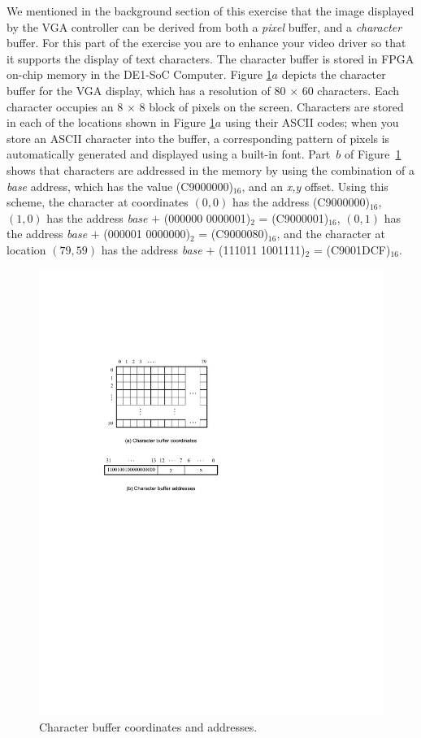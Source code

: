 \documentclass[epsfig,10pt,fullpage]{article}
\begin{document}
\noindent
We mentioned in the background section of this exercise that the image displayed by the VGA
controller can be derived from both a {\it pixel} buffer, and a {\it character} buffer. For 
this part of the exercise you are to enhance your video driver so that it supports the
display of text characters.  The character buffer is stored in FPGA on-chip memory in the 
DE1-SoC Computer. Figure \ref{fig:chars}$a$ depicts the character buffer for the VGA
display, which has a resolution of 80 $\times$ 60 characters. Each character occupies an
8 $\times$ 8 block of pixels on the screen. Characters are stored in each of the locations
shown in Figure \ref{fig:chars}$a$ using their ASCII codes; when you store an ASCII character into
the buffer, a corresponding pattern of pixels is automatically generated and displayed using 
a built-in font. Part~$b$ of Figure~\ref{fig:chars} shows
that characters are addressed in the memory by using the combination of a {\it base} address,
which has the value (C9000000)$_{16}$, and an {\it x,y} offset. Using this scheme, the
character at coordinates $(0,0)$ has the address (C9000000)$_{16}$, 
$(1,0)$ has the address {\it base} $+$ (000000 0000001)$_2$ = (C9000001)$_{16}$, 
$(0,1)$ has the address {\it base} $+$ (000001 0000000)$_2$ = (C9000080)$_{16}$, and 
the character at location $(79,59)$ has the address {\it base} $+$ (111011 1001111)$_2$ = 
(C9001DCF)$_{16}$. 

\begin{figure}[h]
   \begin{center}
       \includegraphics{figures/fig_chars.pdf}
   \end{center}
   \caption{Character buffer coordinates and addresses.}
	\label{fig:chars}
\end{figure}
\end{document}
